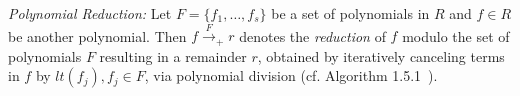 
{\it Polynomial Reduction:} Let $F=\{f_1,\dots,f_s\}$ be
a set of polynomials in $R$ and $f\in R$ be 
another polynomial. Then $f\xrightarrow{F}_+r$ denotes the {\it
  reduction} of $f$ modulo the set of polynomials $F$ resulting in a
remainder $r$, obtained by iteratively canceling terms in $f$ by
$lt(f_j), f_j\in F$, via polynomial division (cf. Algorithm
1.5.1~\cite{gb_book}). 



